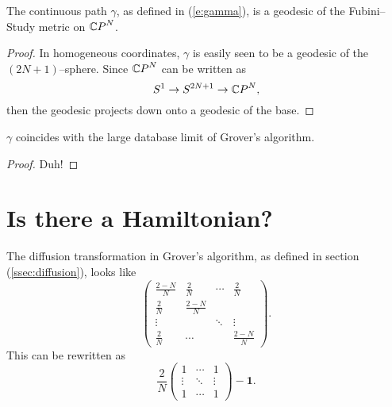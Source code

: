 \begin{prop}
The continuous path $\gamma$, as defined in (\ref{e:gamma}),
is a geodesic of the Fubini--Study metric on ${\mathbb{C} P}^N$.
\end{prop}

\begin{proof}
In homogeneous coordinates, $\gamma$ is easily seen to be
a geodesic of the $(2N+1)$--sphere.
Since ${\mathbb{C} P}^N$ can be written as 
\begin{equation}
S^1\to S^{2N+1}\to {\mathbb{C} P}^N,
\end{equation}
then the geodesic projects down onto a geodesic of the base.
\end{proof}

\begin{prop}
$\gamma$ coincides with the large database
limit of Grover's algorithm.
\end{prop}

\begin{proof}
Duh!
\end{proof}

\section{Is there a Hamiltonian?}


The diffusion transformation in Grover's algorithm,
as defined in section (\ref{ssec:diffusion}), looks like
\begin{equation}
\begin{pmatrix}
    \frac{2-N}{N} & \frac{2}{N} & \cdots & \frac{2}{N} \\
    \frac{2}{N}   & \frac{2-N}{N} & &  \\
    \vdots &  & \ddots & \vdots \\
    \frac{2}{N}   & \cdots && \frac{2-N}{N} 
\end{pmatrix}.
\end{equation}
This can be rewritten as
\begin{equation}
\frac{2}{N}
\begin{pmatrix}
    1 & \cdots & 1 \\
    \vdots & \ddots & \vdots \\
    1 & \cdots & 1
\end{pmatrix}
- \textbf{1}.
\end{equation}


